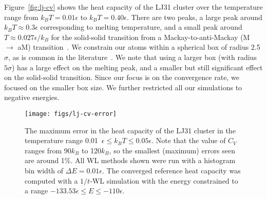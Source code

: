 \documentclass[letterpaper,twocolumn,amsmath,amssymb,pre,aps,10pt]{revtex4-1}
\begin{document}

Figure~\ref{fig:lj-cv} shows the heat capacity of the LJ31 cluster
over the temperature range from $k_BT=0.01\epsilon$ to
$k_BT=0.40\epsilon$.  There are two peaks, a large peak around $k_BT
\approx 0.3\epsilon$ corresponding to melting temperature, and a
small peak around $T \approx 0.027\epsilon/k_B$ for the solid-solid
transition from a Mackay-to-anti-Mackay (M $\rightarrow$ aM)
transition~\cite{doye1997thermally, hendy2001molecular,
  mandelshtam2006multiple}.  We constrain our atoms within a spherical
box of radius 2.5$\sigma$, as is common in the
literature~\cite{poulain2006performances, mandelshtam2006multiple}.
We note that using a larger box (with radius $5\sigma$) has a large
effect on the melting peak, and a smaller but still significant effect
on the solid-solid transition.  Since our focus is on the convergence
rate, we focused on the smaller box size.  We further restricted all
our simulations to negative energies.

\begin{figure}
  \texttt{[image: figs/lj-cv-error]}
  \caption{The maximum error in the heat capacity of the LJ31 cluster
    in the temperature range 0.01~$\epsilon\le k_BT \le 0.05\epsilon$.
    Note that the value of $C_V$ ranges from 90$k_B$ to 120$k_B$, so
    the smallest (maximum) errors seen are around 1\%.  All WL methods
    shown were run with a histogram bin width of $\Delta
    E=0.01\epsilon$.  The converged reference heat capacity was
    computed with a $1/t$-WL simulation with the energy constrained to
    a range $-133.53\epsilon\le E\le -110\epsilon$.
  }
  \label{fig:lj-cv-error}
\end{figure}
\end{document}

